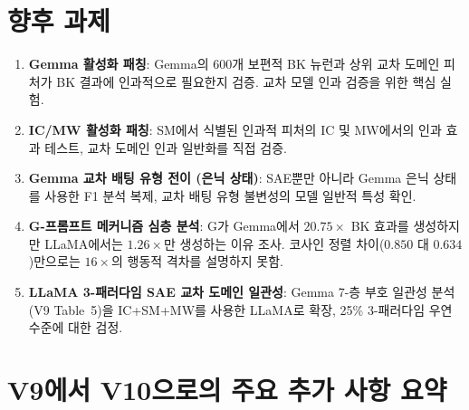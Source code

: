 \documentclass[11pt,a4paper]{article}
\begin{document}
\section{향후 과제}

\begin{enumerate}[nosep]
    \item \textbf{Gemma 활성화 패칭}: Gemma의 600개 보편적 BK 뉴런과 상위 교차 도메인 피처가 BK 결과에 인과적으로 필요한지 검증. 교차 모델 인과 검증을 위한 핵심 실험.
    \item \textbf{IC/MW 활성화 패칭}: SM에서 식별된 인과적 피처의 IC 및 MW에서의 인과 효과 테스트, 교차 도메인 인과 일반화를 직접 검증.
    \item \textbf{Gemma 교차 배팅 유형 전이 (은닉 상태)}: SAE뿐만 아니라 Gemma 은닉 상태를 사용한 F1 분석 복제, 교차 배팅 유형 불변성의 모델 일반적 특성 확인.
    \item \textbf{G-프롬프트 메커니즘 심층 분석}: G가 Gemma에서 $20.75\times$ BK 효과를 생성하지만 LLaMA에서는 $1.26\times$만 생성하는 이유 조사. 코사인 정렬 차이($0.850$ 대 $0.634$)만으로는 $16\times$의 행동적 격차를 설명하지 못함.
    \item \textbf{LLaMA 3-패러다임 SAE 교차 도메인 일관성}: Gemma 7-층 부호 일관성 분석(V9 Table~5)을 IC+SM+MW를 사용한 LLaMA로 확장, 25\% 3-패러다임 우연 수준에 대한 검정.
\end{enumerate}

\appendix
\section{V9에서 V10으로의 주요 추가 사항 요약}
\end{document}
